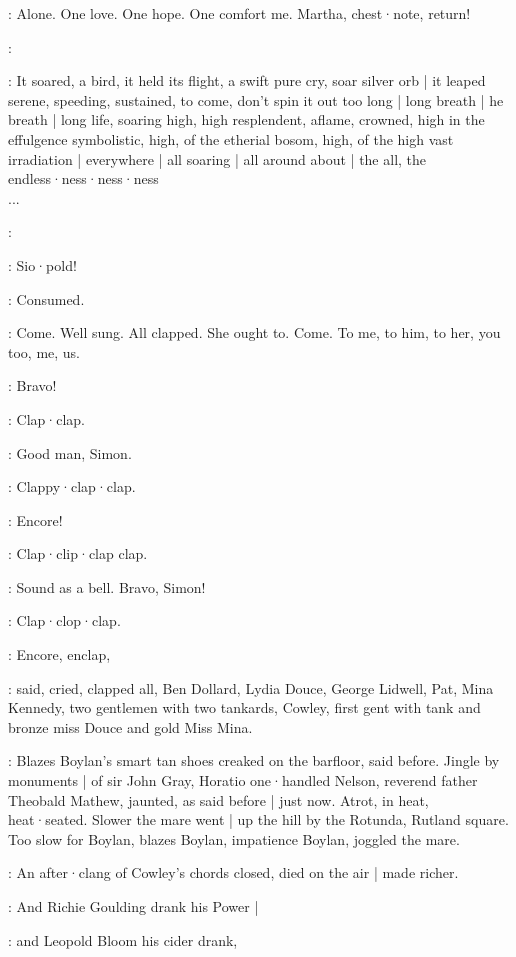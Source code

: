 :
Alone.
One love.
One hope.
One comfort me.
Martha,
chest·note,
return!

\simon:

:
It soared,
a bird,
it held its flight,
a swift pure cry,
soar silver orb |
it leaped serene,
speeding,
sustained,
to come,
don't spin it out too long |
long breath |
he breath |
long life,
soaring high,
high resplendent,
aflame,
crowned,
high in the effulgence symbolistic,
high, of the etherial bosom,
high, of the high vast irradiation |
everywhere |
all soaring |
all around about |
the all,
the endless·ness·ness·ness%
\\
...

\simon:

:
Sio·pold!

\BloomInt:
Consumed.

\BloomInt:
Come.
Well sung.
All clapped.
She ought to.
Come.
To me,
to him,
to her,
you too,
me,
us.

\lenehan:
Bravo!

:
Clap·clap.

\dollard:
Good man,
Simon.

:
Clappy·clap·clap.

\cowley:
Encore!

:
Clap·clip·clap clap.

\lenehan:
Sound as a bell.
Bravo,
Simon!

:
Clap·clop·clap.

:
Encore,
enclap,

:
said,
cried,
clapped all,
Ben Dollard,
Lydia Douce,
George
Lidwell,
Pat,
Mina Kennedy,
two gentlemen with two tankards,
Cowley,
first gent with tank and bronze miss Douce
and gold Miss Mina.

:
Blazes Boylan's smart tan shoes creaked on the barfloor,
said before.
Jingle by monuments |
of sir John Gray,
Horatio one·handled Nelson,
reverend father Theobald Mathew,
jaunted,
as said before |
just now.
Atrot,
in heat,
heat·seated.
Slower the mare went |
up the hill by the Rotunda,
Rutland square.
Too slow for Boylan,
blazes Boylan,
impatience Boylan,
joggled the mare.

:
An after·clang of Cowley's chords closed,
died on the air |
made richer.

:
And Richie Goulding drank his Power |

:
and Leopold Bloom his cider drank,


